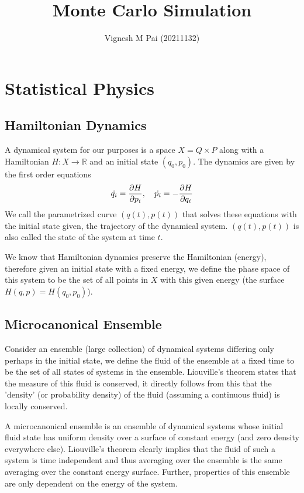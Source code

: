 \documentclass{article}
\title{Monte Carlo Simulation}
\author{Vignesh M Pai (20211132)}
\date{}
\begin{document}
\maketitle

\section{Statistical Physics}

\subsection{Hamiltonian Dynamics}

A dynamical system for our purposes is a space $X = Q \times P$ along with a Hamiltonian $H: X \to \mathbb{R}$ and an initial state $(q_0, p_0)$.
The dynamics are given by the first order equations
\begin{align*}
    \dot{q_i} = \pdv{H}{p_i},\quad \dot{p_i} = - \pdv{H}{q_i}
\end{align*}
We call the parametrized curve $(q(t), p(t))$ that solves these equations with the initial state given, the trajectory of the dynamical system.
$(q(t), p(t))$ is also called the state of the system at time $t$.

We know that Hamiltonian dynamics preserve the Hamiltonian (energy), therefore given an initial state with a fixed energy, we define the phase space
of this system to be the set of all points in $X$ with this given energy (the surface $H(q, p) = H(q_0, p_0)$).

\subsection{Microcanonical Ensemble}

Consider an ensemble (large collection) of dynamical systems differing only perhaps in the initial state,
we define the fluid of the ensemble at a fixed time to be the set of all states of systems in the ensemble.
Liouville's theorem states that the measure of this fluid is conserved, it directly follows from this that
the 'density' (or probability density) of the fluid (assuming a continuous fluid) is locally conserved.

A microcanonical ensemble is an ensemble of dynamical systems whose initial fluid state has uniform density over a surface of constant energy (and zero density everywhere else).
Liouville's theorem clearly implies that the fluid of such a system is time independent
and thus averaging over the ensemble is the same averaging over the constant energy surface.
Further, properties of this ensemble are only dependent on the energy of the system.
\end{document}
